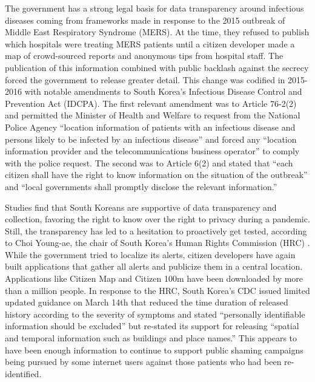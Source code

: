 \documentclass{article}
\begin{document}
The government has a strong legal basis for data transparency around infectious diseases coming from frameworks made in response to the 2015 outbreak of Middle East Respiratory Syndrome (MERS). At the time, they refused to publish which hospitals were treating MERS patients until a citizen developer made a map of crowd-sourced reports and anonymous tips from hospital staff. The publication of this information combined with public backlash against the secrecy forced the government to release greater detail. This change was codified in 2015-2016 with notable amendments to South Korea’s Infectious Disease Control and Prevention Act (IDCPA)\cite{KoreaLawUse}. The first relevant amendment was to Article 76-2(2) and permitted the Minister of Health and Welfare to request from the National Police Agency “location information of patients with an infectious disease and persons likely to be infected by an infectious disease” and forced any “location information provider and the telecommunications business operator” to comply with the police request. The second was to Article 6(2) and stated that “each citizen shall have the right to know information on the situation of the outbreak” and “local governments shall promptly disclose the relevant information.” \cite{KoreaIDAct}

Studies find that South Koreans are supportive of data transparency and collection, favoring the right to know over the right to privacy during a pandemic\cite{KoreaCaseDetails}. Still, the transparency has led to a hesitation to proactively get tested, according to Choi Young-ae, the chair of South Korea’s Human Rights Commission (HRC) \cite{QuarantineFreeTech}. While the government tried to localize its alerts, citizen developers have again built applications that gather all alerts and publicize them in a central location. Applications like Citizen Map and Citizen 100m have been downloaded by more than a million people. In response to the HRC, South Korea’s CDC issued limited updated guidance on March 14th that reduced the time duration of released history according to the severity of symptoms and stated “personally identifiable information should be excluded” but re-stated its support for releasing “spatial and temporal information such as buildings and place names.” \cite{KCDCMarchUpdate} This appears to have been enough information to continue to support public shaming campaigns being pursued by some internet users against those patients who had been re-identified.
\end{document}
